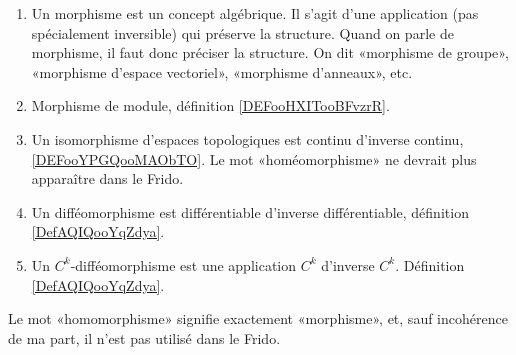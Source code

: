 
\begin{enumerate}
	\item
	      Un morphisme est un concept algébrique. Il s'agit d'une application (pas spécialement inversible) qui préserve la structure. Quand on parle de morphisme, il faut donc préciser la structure. On dit «morphisme de groupe», «morphisme d'espace vectoriel», «morphisme d'anneaux», etc.
	\item
	      Morphisme de module, définition \ref{DEFooHXITooBFvzrR}.
	\item
	      Un isomorphisme d'espaces topologiques est continu d'inverse continu, \ref{DEFooYPGQooMAObTO}. Le mot «homéomorphisme» ne devrait plus apparaître dans le Frido.
	\item
	      Un difféomorphisme est différentiable d'inverse différentiable, définition \ref{DefAQIQooYqZdya}.
	\item
	      Un \( C^k\)-difféomorphisme est une application \( C^k\) d'inverse \( C^k\). Définition \ref{DefAQIQooYqZdya}.
\end{enumerate}
Le mot «homomorphisme» signifie exactement «morphisme», et, sauf incohérence de ma part, il n'est pas utilisé dans le Frido.
